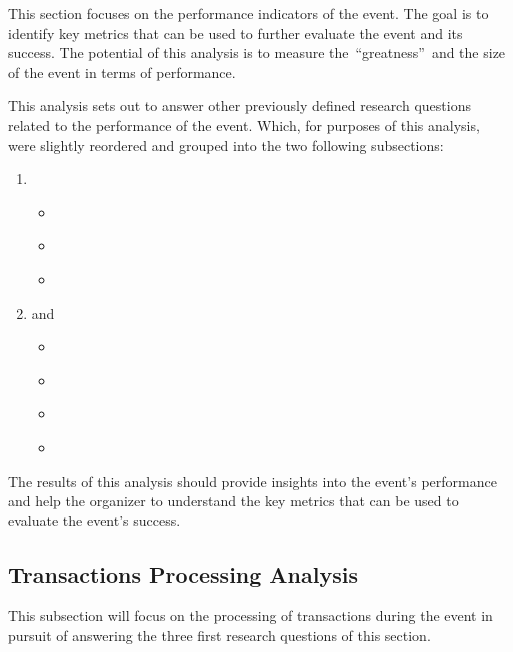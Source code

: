 This section focuses on the performance indicators of the event.
The goal is to identify key metrics that can be used to further evaluate the event and its success.
The potential of this analysis is to measure the~\enquote{greatness}~and the size of the event in terms of performance.

This analysis sets out to answer other previously defined research questions related to the performance of the event.
Which, for purposes of this analysis, were slightly reordered and grouped into the two following subsections:
\begin{enumerate}
	\item {}
	\begin{itemize}
		\small
		\item \textit{}
		\item \textit{}
		\item \textit{}
	\end{itemize}
	\item and~
	\begin{itemize}
		\small
		\item \textit{}
		\item \textit{}
		\item \textit{}
		\item \textit{}
	\end{itemize}
\end{enumerate}

The results of this analysis should provide insights into the event's performance and help the organizer to understand the key metrics that can be used to evaluate the event's success.


\subsection{Transactions Processing Analysis}
\label{subsec:analysis-performance-indicators-transactions}

This subsection will focus on the processing of transactions during the event in pursuit of answering the three first research questions of this section.

